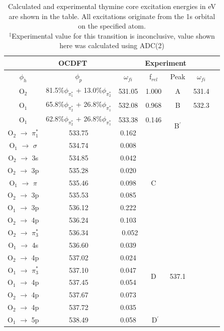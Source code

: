 \documentclass[12pt]{article}
\begin{document}
\begin{table}
\centering
    \begin{tabular}{c@{\hskip 0.22in}c@{\hskip 0.22in}c@{\hskip 0.22in}c@{\hskip 0.52in}c@{\hskip 0.22in}c@{\hskip 0.22in}c}
    \hline
    \hline
  \multicolumn{3}{c}{OCDFT} &\multicolumn{2}{c}{Experiment} \\
  \hline
  $\phi_h$ & $\phi_p$ & $\omega_{fi}$ & f$_{rel}$ & Peak &  $\omega_{fi}$   \\
  \hline
   O$_2$ & 81.5$\%$$\phi_{\pi^*_1}$ + 13.0$\%$$\phi_{\pi^*_2}$& 531.05 & 1.000 &  A & 531.4
   \vspace{2mm}\\
   O$_1$ & 65.8$\%$$\phi_{\pi^*_2}$ + 26.8$\%$$\phi_{\pi^*_1}$ & 532.08 & 0.968 &  B & 532.3 
   \vspace{2mm}\\
   O$_1$ & 62.8$\%$$\phi_{\pi^*_2}$ + 26.8$\%$$\phi_{\pi^*_1}$  & 533.38 & 0.146 & \multirow{2}{*}{ B$^{\prime}$} \\
   O$_2$ $\rightarrow$ $\pi_1^*$ & 533.75 & 0.162 &  \multirow{9}{*}{C} & \multirow{9}{*}{535.7}
   \vspace{2mm}\\
   O$_1$ $\rightarrow$ $\sigma$ & 534.74 & 0.008 \\
   O$_2$ $\rightarrow$ 3s & 534.85 & 0.042 \\
   O$_2$ $\rightarrow$ 3p & 535.28 & 0.020\\
   O$_1$ $\rightarrow$ $\pi$ & 535.46 & 0.098\\
   O$_2$ $\rightarrow$ 3p & 535.53 & 0.085\\
   O$_1$ $\rightarrow$ 3p & 536.12 & 0.222\\
   O$_2$ $\rightarrow$ 4p & 536.24 & 0.103\\
   O$_2$ $\rightarrow$ $\pi_3^*$ & 536.34 & \ 0.052
   \vspace{2mm}\\
   O$_1$ $\rightarrow$ 4s & 536.60 & 0.039 & \multirow{6}{*}{D} & \multirow{6}{*}{537.1}\\
   O$_2$ $\rightarrow$ 4p & 537.02 & 0.024\\
   O$_1$ $\rightarrow$ $\pi_3^*$ & 537.10 & 0.047\\
   O$_1$ $\rightarrow$ 4p & 537.45 & 0.054\\
   O$_2$ $\rightarrow$ 4p & 537.67 & 0.073\\
   O$_2$ $\rightarrow$ 4p & 537.72 & 0.035
   \vspace{2mm}\\
   O$_1$ $\rightarrow$ 5p & 538.49 & 0.058 & \ D$^{\prime}$\\
   \hline
  \end{tabular}
      \caption{Calculated and experimental thymine core excitation energies in eV are shown in the table. All excitations originate from the 1s orbital on the specified atom. \\
  $^{\ddagger}$Experimental value for this transition is inconclusive, value shown here was calculated using ADC(2)}
  \label{figure:MOs}
  \end{table}
\end{document}
